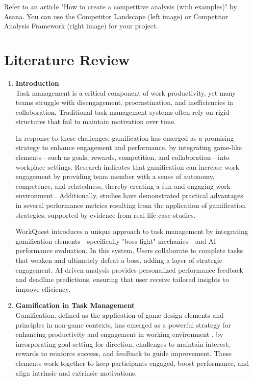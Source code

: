 
Refer to an article "How to create a competitive analysis (with
examples)" by Asana. You can use the Competitor Landscape (left image) or
Competitor Analysis Framework (right image) for your project.

\section{Literature Review}
\label{section:literature-review}
\begin{enumerate}
    \item \textbf{Introduction} \\
        Task management is a critical component of work productivity, yet many teams struggle with disengagement, procrastination, and inefficiencies in collaboration.
        Traditional task management systems often rely on rigid structures that fail to maintain motivation over time. 
        
        In response to these challenges, gamification has emerged as a promising strategy to enhance engagement and performance. by integrating game-like elements—such as goals, rewards, competition, and collaboration—into workplace settings. Research indicates that gamification can increase work engagement by providing team member with a sense of autonomy, competence, and relatedness, thereby creating a fun and engaging work environment \cite{ncbi:pmc10905147}.
        Additionally, studies have demonstrated practical advantages in several performance metrics resulting from the application of gamification strategies, supported by evidence from real-life case studies. \cite{Employee:Gamification}

        WorkQuest introduces a unique approach to task management by integrating gamification elements—specifically "boss fight" mechanics—and AI performance evaluation. In this system, Users collaborate to complete tasks that weaken and ultimately defeat a boss, adding a layer of strategic engagement. AI-driven analysis provides personalized performance feedback and deadline predictions, ensuring that user receive tailored insights to improve efficiency.
    
    \item \textbf{Gamification in Task Management} \\
        Gamification, defined as the application of game-design elements and principles in non-game contexts, has emerged as a powerful strategy for enhancing productivity and engagement in working environment \cite{ncbi:pmc10905147} \cite{Employee:Gamification}.
        by incorporating goal-setting for direction, challenges to maintain interest, rewards to reinforce success, and feedback to guide improvement. These elements work together to keep participants engaged, boost performance, and align intrinsic and extrinsic motivations. \cite{Game:Reward}
        

\end{enumerate}
